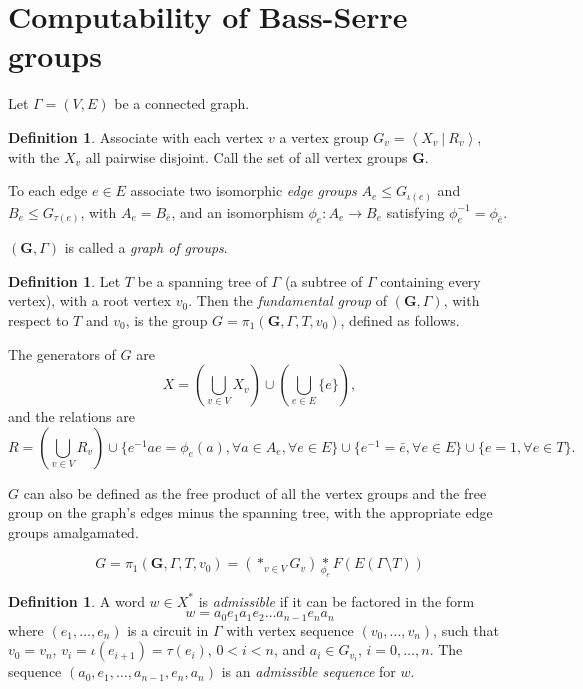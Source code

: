 \documentclass[a4paper]{article}
\newcommand{\present}[2]{\left \langle #1 \: | \: #2 \right \rangle}	%
\newcommand{\fgoagog}{\pi_1(\mathbf{G},\Gamma,T,v_0)}	%
\theoremstyle{plain}
\theoremstyle{definition}
\newtheorem{definition}[theorem]{Definition}
\begin{document}
\section{Computability of Bass-Serre groups \label{bass-serre}}

Let $\Gamma = (V,E)$ be a connected graph. 

\begin{definition}
Associate with each vertex $v$ a vertex group $G_v = \present{X_v}{R_v}$, with the $X_v$ all pairwise disjoint. Call the set of all vertex groups $\mathbf{G}$. 

To each edge $e \in E$ associate two isomorphic {\it edge groups} $A_e \leq G_{\iota(e)}$ and $B_e \leq G_{\tau(e)}$, with $A_e = B_{\bar{e}}$, and an isomorphism $\phi_e : A_e \rightarrow B_e$ satisfying $\phi_e^{-1} = \phi_{\bar{e}}$.

$(\mathbf{G},\Gamma)$ is called a {\it graph of groups}.
\end{definition}

\begin{definition}
	Let $T$ be a spanning tree of $\Gamma$ (a subtree of $\Gamma$ containing every vertex), with a root vertex $v_0$. Then the {\it fundamental group} \cite{Serre_1977} of $(\mathbf{G},\Gamma)$, with respect to $T$ and $v_0$, is the group $G = \fgoagog$, defined as follows.

The generators of $G$ are
\[ X = \left( \bigcup_{v \in V}X_v \right) \cup \left( \bigcup_{e \in E}\{e\} \right),\]
and the relations are 
\[ R = \left( \bigcup_{v \in V}R_v \right) \cup \{e^{-1}ae = \phi_e(a),  \forall a \in A_e, \forall e \in E\} \cup \{ e^{-1} = \bar{e}, \forall e \in E\} \cup \{ e = 1, \forall e \in T \}.\]

$G$ can also be defined as the free product of all the vertex groups and the free group on the graph's edges minus the spanning tree, with the appropriate edge groups amalgamated.

\begin{equation}
G = \fgoagog = \left( \ast_{v \in V} G_v \right) \underset{\phi_e}{\ast} F(E(\Gamma \setminus T))
\end{equation}

\end{definition}

\begin{definition}
A word $w \in X^{\ast}$ is {\it admissible} if it can be factored in the form
\[ w = a_0 e_1 a_1 e_2 \dots a_{n-1} e_n a_n \]
where $(e_1,\dots,e_n)$ is a circuit in $\Gamma$ with vertex sequence $(v_0,\dots,v_n)$, such that $v_0 = v_n$, $v_i = \iota(e_{i+1})=\tau(e_i)$, $0 < i < n$, and $a_i \in G_{v_i}$, $i=0,\dots,n$. The sequence $(a_0,e_1, \dots, a_{n-1},e_n,a_n)$ is an {\it admissible sequence} for $w$.
\end{definition}
\end{document}

